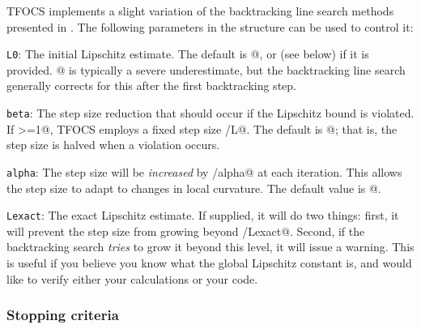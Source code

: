 \documentclass{article}
\begin{document}
TFOCS implements a slight variation of the backtracking line search methods
presented in \cite{TFOCS}. The following parameters in the \verb@opts@ structure
can be used to control it:
\begin{trivlist}
\item \texttt{L0}: The initial Lipschitz estimate. The default is @, or
\verb@Lexact@ (see below) if it is provided. @ is 
typically a severe underestimate, but the backtracking line search generally
corrects for this after the first backtracking step.
\item \texttt{beta}: The step size reduction that should occur if the Lipschitz bound
is violated. If \verb@beta>=1@, TFOCS employs a fixed step size /L@. The default
is @; that is, the step size is halved when a violation occurs.
\item \texttt{alpha}: The step size will be \emph{increased} by /alpha@
at each iteration. This allows the step size to adapt to changes in local curvature.
The default value is @.
\item \texttt{Lexact}: The exact Lipschitz estimate. If supplied, it will do
two things: first, it will prevent the step size from growing beyond /Lexact@.
Second, if the backtracking search \emph{tries} to grow it beyond this level,
it will issue a warning. This is useful if you believe you know what the global
Lipschitz constant is, and would like to verify either your calculations or
your code.
\end{trivlist}

\subsubsection{Stopping criteria}
\end{document}
